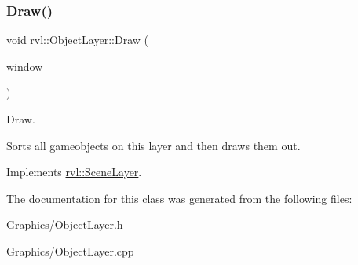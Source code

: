 \subsubsection{\texorpdfstring{Draw()}{Draw()}}
{\footnotesize\ttfamily void rvl\+::\+Object\+Layer\+::\+Draw (\begin{DoxyParamCaption}\item[{sf\+::\+Render\+Window \&}]{window }\end{DoxyParamCaption})\hspace{0.3cm}{\ttfamily [virtual]}}



Draw. 

Sorts all gameobjects on this layer and then draws them out. 

Implements \hyperlink{classrvl_1_1_scene_layer}{rvl\+::\+Scene\+Layer}.



The documentation for this class was generated from the following files\+:\begin{DoxyCompactItemize}
\item 
Graphics/Object\+Layer.\+h\item 
Graphics/Object\+Layer.\+cpp\end{DoxyCompactItemize}
